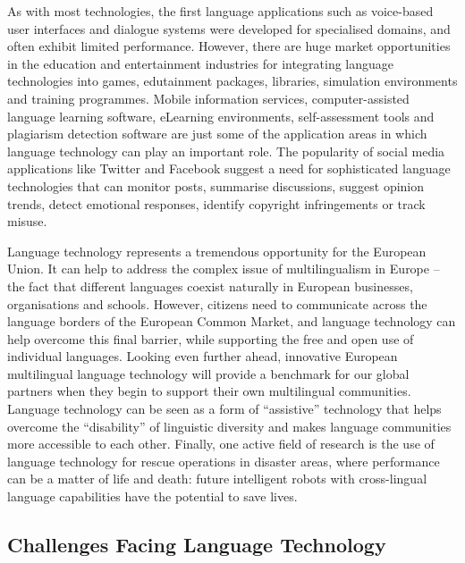 \begin{multicols}{2}
As with most technologies, the first language applications such as voice-based user interfaces and dialogue systems were developed for specialised domains, and often exhibit limited performance. However, there are huge market opportunities in the education and entertainment industries for integrating language technologies into games, edutainment packages, libraries, simulation environments and training programmes. Mobile information services, computer-assisted language learning software, eLearning environments, self-assessment tools and plagiarism detection software are just some of the application areas in which language technology can play an important role. The popularity of social media applications like Twitter and Facebook suggest a need for sophisticated language technologies that can monitor posts, summarise discussions, suggest opinion trends, detect emotional responses, identify copyright infringements or track misuse.


Language technology represents a tremendous opportunity for the European Union. It can help to address the complex issue of multilingualism in Europe – the fact that different languages coexist naturally in European businesses, organisations and schools. However, citizens need to communicate across the language borders of the European Common Market, and language technology can help overcome this final barrier, while supporting the free and open use of individual languages. Looking even further ahead, innovative European multilingual language technology will provide a benchmark for our global partners when they begin to support their own multilingual communities. Language technology can be seen as a form of “assistive” technology that helps overcome the “disability” of linguistic diversity and makes language communities more accessible to each other. Finally, one active field of research is the use of language technology for rescue operations in disaster areas, where performance can be a matter of life and death: future intelligent robots with cross-lingual language capabilities have the potential to save lives.

\subsection{Challenges Facing Language Technology}


\end{multicols}
